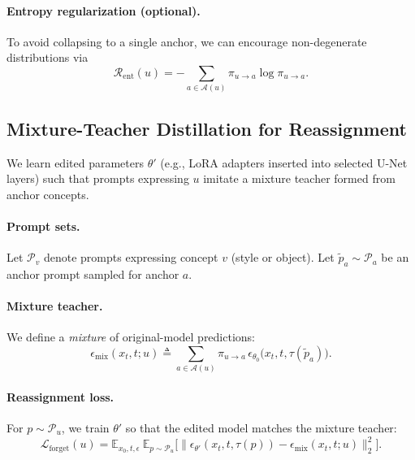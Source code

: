 \paragraph{Entropy regularization (optional).}
To avoid collapsing to a single anchor, we can encourage non-degenerate distributions via
\begin{equation}
\mathcal{R}_{\mathrm{ent}}(u) = -\sum_{a\in\mathcal{A}(u)} \pi_{u\rightarrow a}\log \pi_{u\rightarrow a}.
\label{eq:entropy}
\end{equation}

\subsection{Mixture-Teacher Distillation for Reassignment}
\label{sec:dirA}

We learn edited parameters $\theta'$ (e.g., LoRA adapters inserted into selected U-Net layers) such that prompts expressing $u$ imitate a {mixture teacher} formed from anchor concepts.

\paragraph{Prompt sets.}
Let $\mathcal{P}_v$ denote prompts expressing concept $v$ (style or object).
Let $\tilde{p}_a \sim \mathcal{P}_a$ be an anchor prompt sampled for anchor $a$.

\paragraph{Mixture teacher.}
We define a \emph{mixture} of original-model predictions:
\begin{equation}
\epsilon_{\mathrm{mix}}(x_t,t;u) \triangleq
\sum_{a\in\mathcal{A}(u)} \pi_{u\rightarrow a}\,
\epsilon_{\theta_0}\big(x_t,t,\tau(\tilde{p}_a)\big).
\label{eq:eps-mix}
\end{equation}

\paragraph{Reassignment loss.}
For $p\sim\mathcal{P}_u$, we train $\theta'$ so that the edited model matches the mixture teacher:
\begin{equation}
\mathcal{L}_{\mathrm{forget}}(u) =
\mathbb{E}_{x_0,t,\epsilon}\ \mathbb{E}_{p\sim\mathcal{P}_u}
\Big[
\big\|
\epsilon_{\theta'}(x_t,t,\tau(p)) - \epsilon_{\mathrm{mix}}(x_t,t;u)
\big\|_2^2
\Big].
\label{eq:forget-loss-A}
\end{equation}

